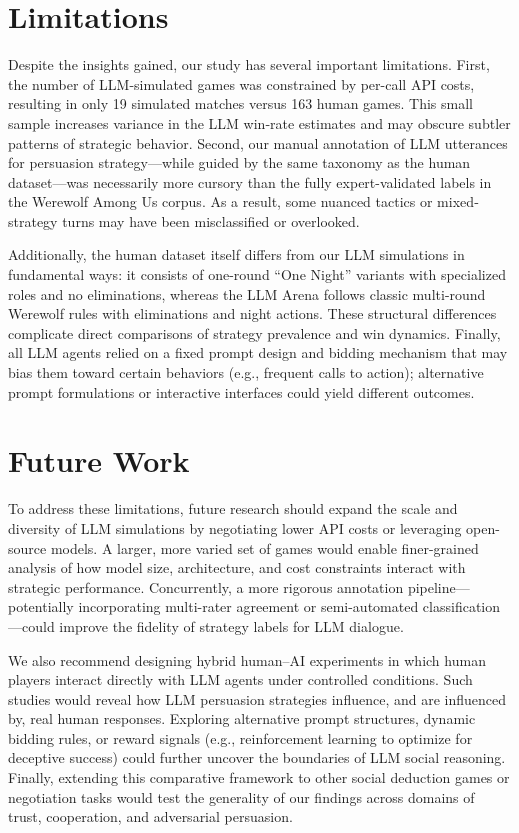 \documentclass[
  letterpaper,
  DIV=11,
  numbers=noendperiod,
  oneside]{scrreprt}
\begin{document}
\section{Limitations}\label{limitations}

Despite the insights gained, our study has several important
limitations. First, the number of LLM-simulated games was constrained by
per-call API costs, resulting in only 19 simulated matches versus 163
human games. This small sample increases variance in the LLM win‐rate
estimates and may obscure subtler patterns of strategic behavior.
Second, our manual annotation of LLM utterances for persuasion
strategy---while guided by the same taxonomy as the human dataset---was
necessarily more cursory than the fully expert-validated labels in the
Werewolf Among Us corpus. As a result, some nuanced tactics or
mixed‐strategy turns may have been misclassified or overlooked.

Additionally, the human dataset itself differs from our LLM simulations
in fundamental ways: it consists of one-round ``One Night'' variants
with specialized roles and no eliminations, whereas the LLM Arena
follows classic multi-round Werewolf rules with eliminations and night
actions. These structural differences complicate direct comparisons of
strategy prevalence and win dynamics. Finally, all LLM agents relied on
a fixed prompt design and bidding mechanism that may bias them toward
certain behaviors (e.g., frequent calls to action); alternative prompt
formulations or interactive interfaces could yield different outcomes.

\section{Future Work}\label{future-work}

To address these limitations, future research should expand the scale
and diversity of LLM simulations by negotiating lower API costs or
leveraging open-source models. A larger, more varied set of games would
enable finer-grained analysis of how model size, architecture, and cost
constraints interact with strategic performance. Concurrently, a more
rigorous annotation pipeline---potentially incorporating multi-rater
agreement or semi-automated classification---could improve the fidelity
of strategy labels for LLM dialogue.

We also recommend designing hybrid human--AI experiments in which human
players interact directly with LLM agents under controlled conditions.
Such studies would reveal how LLM persuasion strategies influence, and
are influenced by, real human responses. Exploring alternative prompt
structures, dynamic bidding rules, or reward signals (e.g.,
reinforcement learning to optimize for deceptive success) could further
uncover the boundaries of LLM social reasoning. Finally, extending this
comparative framework to other social deduction games or negotiation
tasks would test the generality of our findings across domains of trust,
cooperation, and adversarial persuasion.
\end{document}
